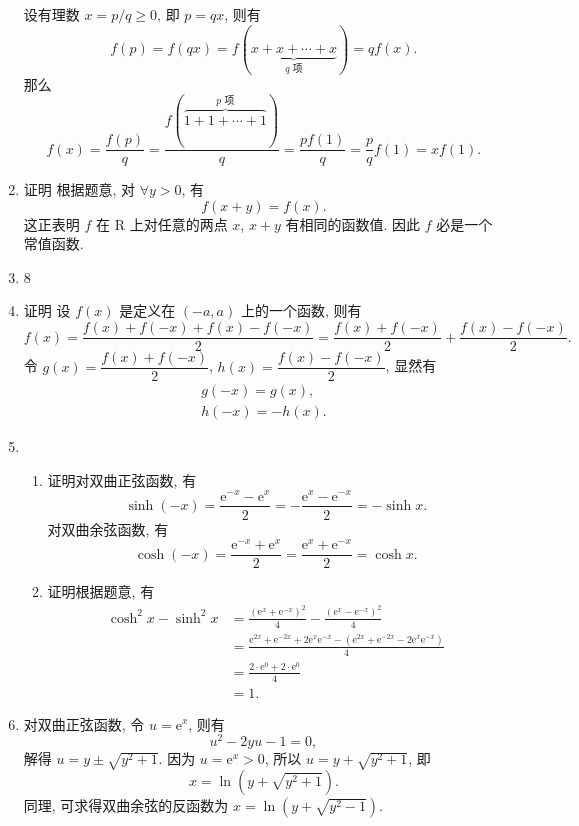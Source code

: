 \begin{enumerate}
        设有理数 $x = p/q \geqslant 0$, 即 $p = qx$, 则有
        \[
            f(p) = f(qx) = f(\underbrace{x + x + \cdots + x}_{\text{$q$ 项}}) = qf(x).
        \]
        那么
        \[
            f(x) = \frac{f(p)}{q} = \frac{f(\overbrace{1 + 1 + \cdots + 1}^{\text{$p$ 项}})}{q} = \frac{pf(1)}{q} = \frac pq f(1) = xf(1).    
        \]
    \item %
        {\heiti 证明} 根据题意, 对 $\forall y > 0$, 有
        \[
            f(x + y) = f(x).    
        \]
        这正表明 $f$ 在 $\mathrm{R}$ 上对任意的两点 $x$, $x + y$ 有相同的函数值. 因此 $f$ 必是一个常值函数.  
    \item 8
    \item %
        {\heiti 证明} 设 $f(x)$ 是定义在 $(-a, a)$ 上的一个函数, 则有
        \[
            f(x) = \frac{f(x) + f(-x) + f(x) - f(-x)}{2} = \frac{f(x) + f(-x)}{2} + \frac{f(x) - f(-x)}{2}.    
        \]
        令 $g(x) = \dfrac{f(x) + f(-x)}{2}$, $h(x) = \dfrac{f(x) - f(-x)}{2}$, 显然有
        \begin{gather*}
            g(-x) = g(x), \\
            h(-x) = -h(x).
        \end{gather*}
    \item %
        \begin{enumerate}[(1)]
            \item %
                {\heiti 证明}\quad 对双曲正弦函数, 有
                \[
                    \sinh(-x) = \frac{\mathrm{e}^{-x} - \mathrm{e}^x}{2} = -\frac{\mathrm{e}^x - \mathrm{e}^{-x}}{2} = -\sinh x.    
                \]
                对双曲余弦函数, 有
                \[
                    \cosh(-x) = \frac{\mathrm{e}^{-x} + \mathrm{e}^x}{2} = \frac{\mathrm{e}^x + \mathrm{e}^{-x}}{2} = \cosh x.     
                \]
            \item %
                {\heiti 证明}\quad 根据题意, 有
                \begin{align*}
                    \cosh^2x - \sinh^2x &= \frac{(\mathrm{e}^x + \mathrm{e}^{-x})^2}{4} - \frac{(\mathrm{e}^x - \mathrm{e}^{-x})^2}{4} \\
                                        &= \frac{\mathrm{e}^{2x} + \mathrm{e}^{-2x} + 2\mathrm{e}^x\mathrm{e}^{-x} - (\mathrm{e}^{2x} + \mathrm{e}^{-2x} - 2\mathrm{e}^x\mathrm{e}^{-x})}{4} \\
                                        &= \frac{2 \cdot \mathrm{e}^0 + 2 \cdot \mathrm{e}^0}{4} \\
                                        &= 1.
                \end{align*}
        \end{enumerate}
    \item %
        对双曲正弦函数, 令 $u = \mathrm{e}^x$, 则有
        \[
            u^2 - 2yu - 1 = 0,    
        \]
        解得 $u = y \pm \sqrt{y^2 + 1}$. 因为 $u = \mathrm{e}^x > 0$, 所以 $u = y + \sqrt{y^2 + 1}$, 即
        \[
            x = \ln(y + \sqrt{y^2 + 1}).    
        \]
        同理, 可求得双曲余弦的反函数为 $x = \ln(y + \sqrt{y^2 - 1})$.
\end{enumerate}

% 